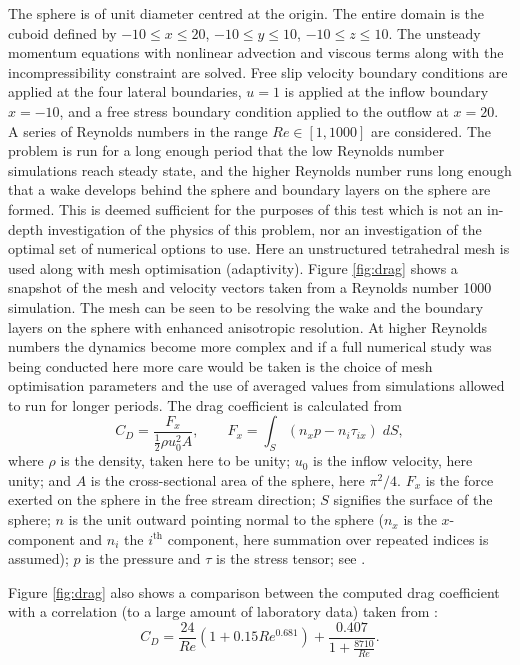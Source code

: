 The sphere is of unit diameter centred at the origin. The entire domain is
the cuboid defined by $-10\le x\le 20$, $-10\le y\le 10$, $-10\le z\le 10$.
The unsteady momentum equations with nonlinear advection and viscous terms
along with the incompressibility constraint are solved. Free slip velocity
boundary conditions are applied at the four lateral boundaries, $u=1$ is
applied at the inflow boundary $x=-10$, and a free stress boundary condition
applied to the outflow at $x=20$. A series of Reynolds numbers in the range
$Re\in [1,1000]$ are considered. The problem is run for a long enough
period that the low Reynolds number simulations reach steady state, and the
higher Reynolds number runs long enough that a wake develops behind the
sphere and boundary layers on the sphere are formed.  This is deemed
sufficient for the purposes of this test which is not an in-depth
investigation of the physics of this problem, nor an investigation of the optimal
set of numerical options to use.  Here an unstructured
tetrahedral mesh is used along with mesh optimisation (adaptivity). 
Figure \ref{fig:drag} shows a snapshot of the
mesh and velocity vectors taken from a Reynolds number 1000 simulation. The
mesh can be seen to be resolving the wake and the boundary layers on the
sphere with enhanced anisotropic resolution. At higher Reynolds numbers the
dynamics become more complex and if a full numerical study was being
conducted here more care would be taken is the choice of mesh optimisation
parameters and the use of averaged values from simulations allowed to run
for longer periods. The drag coefficient is calculated from
\begin{equation}
C_D = \frac{F_x}{\frac{1}{2}\rho u_0^2 A},\qquad F_x = \int_S (n_xp - n_i\tau_{ix})\;dS,
\end{equation}
where $\rho$ is the density, taken here to be unity; 
$u_0$ is the inflow velocity, here unity; 
and $A$ is the cross-sectional area of the sphere, here $\pi^2/4$. 
$F_x$ is the force 
exerted on the sphere in the free stream direction;
$S$ signifies the surface of the sphere; $n$ is the 
unit outward pointing normal to the sphere 
($n_x$ is the $x$-component and $n_i$ the $i^{\textrm{th}}$ 
component, here summation over repeated indices is assumed); 
$p$ is the pressure and $\tau$ is the stress tensor;
see \citet{panton2006}.

Figure \ref{fig:drag} also shows a comparison between the computed drag coefficient with
a correlation (to a large amount of laboratory data) taken from \citet{brown2003}:
\begin{equation}
C_D = \frac{24}{Re}\left(1+0.15Re^{0.681}\right) + \frac{0.407}{1+\frac{8710}{Re}}.
\label{drag_corr}
\end{equation}

